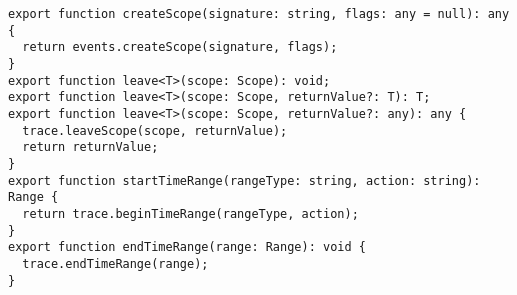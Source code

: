 \begin{verbatim}
export function createScope(signature: string, flags: any = null): any {
  return events.createScope(signature, flags);
}
export function leave<T>(scope: Scope): void;
export function leave<T>(scope: Scope, returnValue?: T): T;
export function leave<T>(scope: Scope, returnValue?: any): any {
  trace.leaveScope(scope, returnValue);
  return returnValue;
}
export function startTimeRange(rangeType: string, action: string): Range {
  return trace.beginTimeRange(rangeType, action);
}
export function endTimeRange(range: Range): void {
  trace.endTimeRange(range);
}
\end{verbatim}
